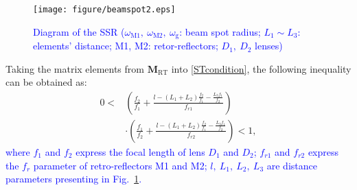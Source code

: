 \documentclass{IEEEtran}
\begin{document}
\begin{figure}[t]
	\centering
	\texttt{[image: figure/beamspot2.eps]}
	\caption{\textcolor{blue}{Diagram of the SSR ($\omega_\mathrm{M1},~\omega_\mathrm{M2},~\omega_\mathrm{g}$: beam spot radius; $L_1 \sim L_3$: elements' distance; M1, M2: retor-reflectors; $D_1,~D_2$ lenses)}}
	\label{Rbcsystem2}
\end{figure}
Taking the matrix elements from $\mathbf{M}_\mathrm{RT}$ into \eqref{STcondition}, the following inequality can be obtained as:
\begin{equation}\label{STcondition2}
\begin{aligned}
    0<&(\frac{f_2}{f_1}+\frac{l-(L_1+L_2)\frac{f_2}{f_1}-\frac{L_3f_1}{f_2}}{f_{r1}})\\
    &\cdot(\frac{f_1}{f_2}+\frac{l-(L_1+L_2)\frac{f_2}{f_1}-\frac{L_3f_1}{f_2}}{f_{r2}})<1,
\end{aligned}
\end{equation}
\textcolor{blue}{where $f_1$ and $f_2$ express the focal length of lens $D_1$ and $D_2$; $f_{r1}$ and $f_{r2}$ express the $f_r$ parameter of retro-reflectors M1 and M2; $l,~L_1,~L_2,~L_3$ are distance parameters presenting in Fig.~\ref{Rbcsystem2}.}
\end{document}
